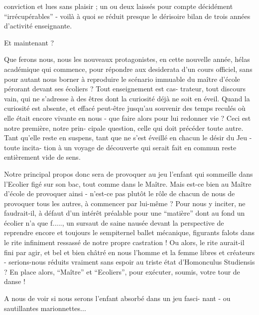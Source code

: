 
conviction et lues sans plaisir ; un ou  deux laissés pour compte décidément
``irrécupérables'' - voilà à quoi se réduit presque le dérisoire bilan de
trois années d'activité enseignante.

Et maintenant ?

Que ferons nous, nous les nouveaux protagonistes, en cette nouvelle
année, hélas académique qui commence, pour répondre aux desiderata d'un cours
officiel, sans pour autant nous borner à reproduire le scénario immuable
du maître d'école pérorant devant ses écoliers ? Tout enseignement est cas-%
trateur, tout discours vain, qui ne s'adresse à des êtres dont la curiosité
déjà ne soit en éveil. Quand la curiosité est absente, et effacé peut-être
jusqu'au souvenir des temps reculés où elle était encore vivante en nous -
que faire alors pour lui redonner vie ? Ceci est notre première, notre prin-%
cipale question, celle qui doit précéder toute autre. Tant qu'elle reste en
suspens, tant que ne s'est éveillé en chacun le désir du Jeu - toute incita-%
tion à un voyage de découverte qui serait fait en commun reste entièrement
vide de sens.

Notre principal propos donc sera de provoquer au jeu l'enfant qui
sommeille dans l'Ecolier figé sur son bac, tout comme dans le Maître. Mais
est-ce bien au Maître d'école de provoquer ainsi - n'est-ce pas plutôt le rôle
de chacun de nous de provoquer tous les autres, à commencer par lui-même ?
Pour nous y inciter, ne faudrait-il, à défaut d'un intérêt  préalable pour une
``matière'' dont au fond un écolier n'a que f....., un sursaut de saine nausée
devant la perspective de reprendre encore et toujours le sempiternel ballet
mécanique, figurants falots dans le rite infiniment ressassé de notre propre
castration ! Ou alors, le rite aurait-il fini par agir, et bel et bien châtré
en nous l'homme et la femme libres et créateurs - serions-nous réduits vraiment
sans espoir au triste état d'Homonculus Studiensis ? En place alors, ``Maître''
et ``Ecoliers'', pour exécuter, soumis, votre tour de danse !

A nous de voir si nous serons l'enfant absorbé dans un jeu fasci-%
nant - ou sautillantes marionnettes...

